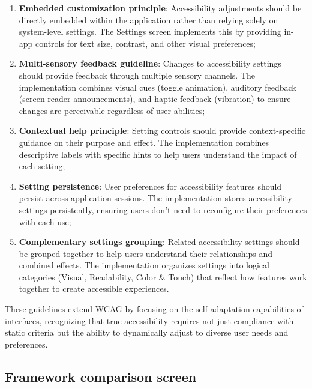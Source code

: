 \begin{enumerate}
    \item \textbf{Embedded customization principle}: Accessibility adjustments should be directly embedded within the application rather than relying solely on system-level settings. The Settings screen implements this by providing in-app controls for text size, contrast, and other visual preferences;
    
    \item \textbf{Multi-sensory feedback guideline}: Changes to accessibility settings should provide feedback through multiple sensory channels. The implementation combines visual cues (toggle animation), auditory feedback (screen reader announcements), and haptic feedback (vibration) to ensure changes are perceivable regardless of user abilities;
    
    \item \textbf{Contextual help principle}: Setting controls should provide context-specific guidance on their purpose and effect. The implementation combines descriptive labels with specific hints to help users understand the impact of each setting;
    
    \item \textbf{Setting persistence}: User preferences for accessibility features should persist across application sessions. The implementation stores accessibility settings persistently, ensuring users don't need to reconfigure their preferences with each use;
    
    \item \textbf{Complementary settings grouping}: Related accessibility settings should be grouped together to help users understand their relationships and combined effects. The implementation organizes settings into logical categories (Visual, Readability, Color \& Touch) that reflect how features work together to create accessible experiences.
\end{enumerate}

These guidelines extend WCAG by focusing on the self-adaptation capabilities of interfaces, recognizing that true accessibility requires not just compliance with static criteria but the ability to dynamically adjust to diverse user needs and preferences.

\subsection{Framework comparison screen}
\label{subsec:framework-comparison-screen}


